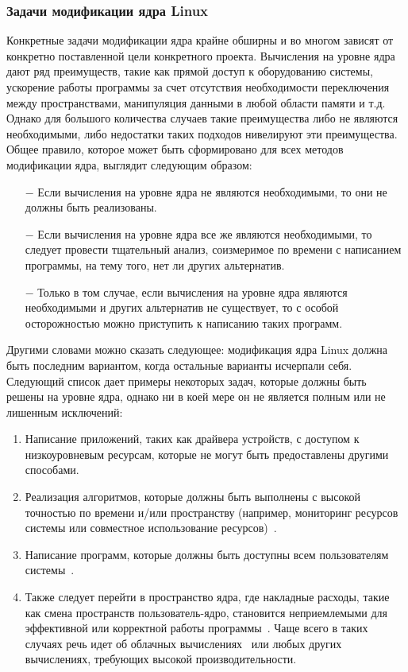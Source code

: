 \subsubsection{Задачи модификации ядра Linux}\label{subsec:---linux}
Конкретные задачи модификации ядра крайне обширны и во многом зависят от конкретно поставленной цели конкретного проекта.
Вычисления на уровне ядра дают ряд преимуществ, такие как прямой доступ к оборудованию системы,
ускорение работы программы за счет отсутствия необходимости переключения между пространствами,
манипуляция данными в любой области памяти и т.д.
Однако для большого количества случаев такие преимущества либо не являются необходимыми, либо недостатки таких подходов нивелируют эти преимущества.
Общее правило, которое может быть сформировано для всех методов модификации ядра, выглядит следующим образом:
\begin{itemize}
    \item[$-$] Если вычисления на уровне ядра не являются необходимыми, то они не должны быть реализованы.
    \item[$-$] Если вычисления на уровне ядра все же являются необходимыми, то следует провести тщательный анализ, соизмеримое по времени с написанием программы, на тему того, нет ли других альтернатив.
    \item[$-$] Только в том случае, если вычисления на уровне ядра являются необходимыми и других альтернатив не существует, то с особой осторожностью можно приступить к написанию таких программ.
\end{itemize}

Другими словами можно сказать следующее: модификация ядра Linux должна быть последним вариантом,
когда остальные варианты исчерпали себя.
\\
\indent Следующий список дает примеры некоторых задач, которые должны быть решены на уровне ядра, однако ни в коей мере он не является полным или не лишенным исключений:
\begin{enumerate}
    \item Написание приложений, таких как драйвера устройств, с доступом к низкоуровневым ресурсам, которые не могут быть предоставлены другими способами.
    \item Реализация алгоритмов, которые должны быть выполнены с высокой точностью по времени и/или пространству (например, мониторинг ресурсов системы или совместное использование ресурсов)~\cite{overhead-timer}.
    \item Написание программ, которые должны быть доступны всем пользователям системы~\cite{overhead-timer}.
    \item Также следует перейти в пространство ядра, где накладные расходы, такие как смена пространств пользователь-ядро, становится неприемлемыми для эффективной или корректной работы программы~\cite{overhead-timer}.
    Чаще всего в таких случаях речь идет об облачных вычислениях~\cite{overhead-cloud} или любых других вычислениях, требующих высокой производительности.
\end{enumerate}
